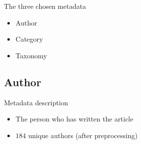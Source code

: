 \begin{frame}{\insertsection}{The three chosen metadata}
	\begin{itemize}
		\item Author
		\item Category
		\item Taxonomy
	\end{itemize}
\end{frame}

\subsection{Author}

\begin{frame}{\insertsubsection}{Metadata description}
	\begin{itemize}
		\item The person who has written the article
		\item $184$ unique authors (after preprocessing)
	\end{itemize}
	\vspace{2em}
\end{frame}
